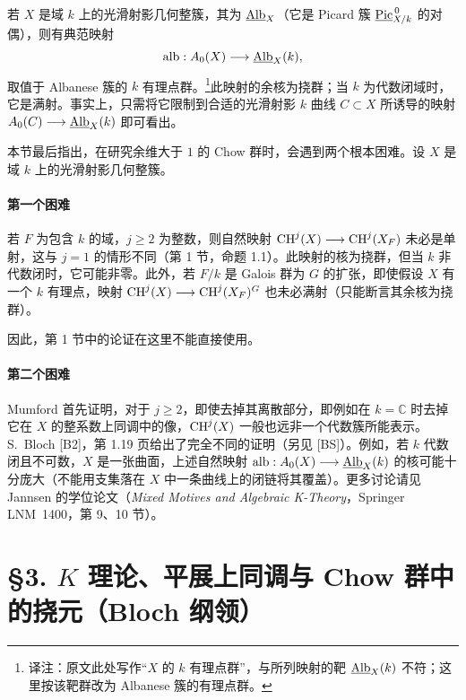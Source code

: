 若 $X$ 是域 $k$ 上的光滑射影几何整簇，其为 $\underline{\operatorname{Alb}}_X$（它是 Picard 簇 $\underline{\operatorname{Pic}}^{\,0}_{X/k}$ 的对偶），则有典范映射
\[
\operatorname{alb}:A_0(X)\longrightarrow\underline{\operatorname{Alb}}_X(k),
\]
取值于 Albanese 簇的 $k$ 有理点群。\footnote{译注：原文此处写作“$X$ 的 $k$ 有理点群”，与所列映射的靶 $\underline{\operatorname{Alb}}_X(k)$ 不符；这里按该靶群改为 Albanese 簇的有理点群。}此映射的余核为挠群；当 $k$ 为代数闭域时，它是满射。事实上，只需将它限制到合适的光滑射影 $k$ 曲线 $C\subset X$ 所诱导的映射 $A_0(C)\longrightarrow\underline{\operatorname{Alb}}_X(k)$ 即可看出。

本节最后指出，在研究余维大于 $1$ 的 Chow 群时，会遇到两个根本困难。设 $X$ 是域 $k$ 上的光滑射影几何整簇。

\paragraph{第一个困难}
若 $F$ 为包含 $k$ 的域，$j\ge2$ 为整数，则自然映射 $\operatorname{CH}^j(X)\longrightarrow\operatorname{CH}^j(X_F)$ 未必是单射，这与 $j=1$ 的情形不同（第 1 节，命题 1.1）。此映射的核为挠群，但当 $k$ 非代数闭时，它可能非零。此外，若 $F/k$ 是 Galois 群为 $G$ 的扩张，即使假设 $X$ 有一个 $k$ 有理点，映射 $\operatorname{CH}^j(X)\longrightarrow\operatorname{CH}^j(X_F)^G$ 也未必满射（只能断言其余核为挠群）。

因此，第 1 节中的论证在这里不能直接使用。

\paragraph{第二个困难}
Mumford 首先证明，对于 $j\ge2$，即使去掉其离散部分，即例如在 $k=\mathbb C$ 时去掉它在 $X$ 的整系数上同调中的像，$\operatorname{CH}^j(X)$ 一般也远非一个代数簇所能表示。S.~Bloch [B2]，第 1.19 页给出了完全不同的证明（另见 [BS]）。例如，若 $k$ 代数闭且不可数，$X$ 是一张曲面，上述自然映射 $\operatorname{alb}:A_0(X)\longrightarrow\underline{\operatorname{Alb}}_X(k)$ 的核可能十分庞大（不能用支集落在 $X$ 中一条曲线上的闭链将其覆盖）。更多讨论请见 Jannsen 的学位论文（\emph{Mixed Motives and Algebraic K-Theory}，Springer LNM~1400，第 9、10 节）。

\section*{§3. $K$ 理论、平展上同调与 Chow 群中的挠元（Bloch 纲领）}
